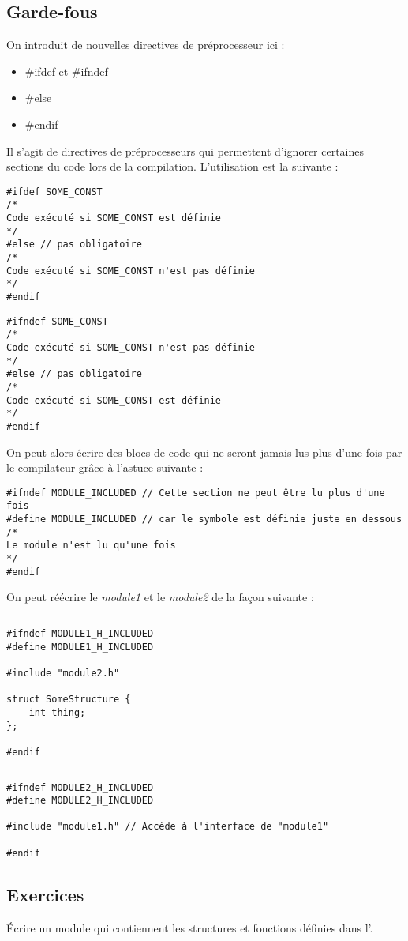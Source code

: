 \documentclass[../../../main.tex]{subfiles}
\begin{document}
\subsection{Garde-fous}
On introduit de nouvelles directives de préprocesseur ici : 
\begin{itemize}
	\item \textsf{\#ifdef} et \textsf{\#ifndef}
	\item \textsf{\#else}
	\item \textsf{\#endif}
\end{itemize}
Il s'agit de directives de préprocesseurs qui permettent d'ignorer certaines sections du code lors de la compilation. L'utilisation est la suivante :

\begin{minipage}{0.5\textwidth}
	\begin{verbatim}
#ifdef SOME_CONST
/*
Code exécuté si SOME_CONST est définie
*/
#else // pas obligatoire
/*
Code exécuté si SOME_CONST n'est pas définie
*/
#endif
\end{verbatim}
\end{minipage}
\begin{minipage}{0.5\textwidth}
\begin{verbatim}
#ifndef SOME_CONST
/*
Code exécuté si SOME_CONST n'est pas définie
*/
#else // pas obligatoire
/*
Code exécuté si SOME_CONST est définie
*/
#endif
\end{verbatim}
\end{minipage}

On peut alors écrire des blocs de code qui ne seront jamais lus plus d'une fois par le compilateur grâce à l'astuce suivante :
\begin{verbatim}
#ifndef MODULE_INCLUDED // Cette section ne peut être lu plus d'une fois
#define MODULE_INCLUDED // car le symbole est définie juste en dessous
/*
Le module n'est lu qu'une fois
*/
#endif
\end{verbatim}
On peut réécrire le \textit{module1} et le \textit{module2} de la façon suivante :
\begin{lstlisting}[title=module1.h]
\end{lstlisting}
\begin{verbatim}
#ifndef MODULE1_H_INCLUDED
#define MODULE1_H_INCLUDED

#include "module2.h"

struct SomeStructure {
	int thing;
};

#endif
\end{verbatim}
\begin{lstlisting}[title=module2.h]
\end{lstlisting}
\begin{verbatim}
#ifndef MODULE2_H_INCLUDED
#define MODULE2_H_INCLUDED

#include "module1.h" // Accède à l'interface de "module1"

#endif
\end{verbatim}
\subsection{Exercices}
 Écrire un module qui contiennent les structures et fonctions définies dans l'.
\end{document}
